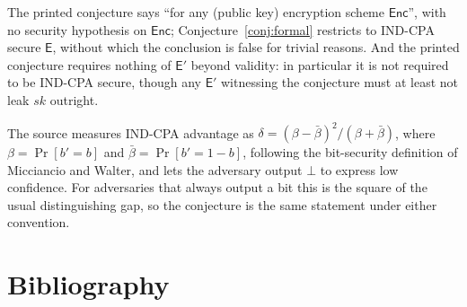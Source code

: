 \documentclass{conjura-conjecture}
\newcommand{\Enc}{\mathsf{Enc}}
\begin{document}
\begin{remark}\label{rem:reading}
The printed conjecture says ``for any (public key) encryption scheme
$\Enc$'', with no security hypothesis on $\Enc$;
Conjecture~\ref{conj:formal} restricts to IND-CPA secure $\mathsf{E}$,
without which the conclusion is false for trivial reasons. And the
printed conjecture requires nothing of $\mathsf{E}'$ beyond validity:
in particular it is not required to be IND-CPA secure, though any
$\mathsf{E}'$ witnessing the conjecture must at least not leak $sk$
outright.
\end{remark}

\begin{remark}\label{rem:advantage}
The source measures IND-CPA advantage as $\delta = (\beta -
\bar\beta)^{2}/(\beta + \bar\beta)$, where $\beta = \Pr[b' = b]$ and
$\bar\beta = \Pr[b' = 1-b]$, following the bit-security definition of
Micciancio and Walter, and lets the adversary output $\bot$ to express
low confidence. For adversaries that always output a bit this is the
square of the usual distinguishing gap, so the conjecture is the same
statement under either convention.
\end{remark}

\section{Bibliography}
\end{document}
